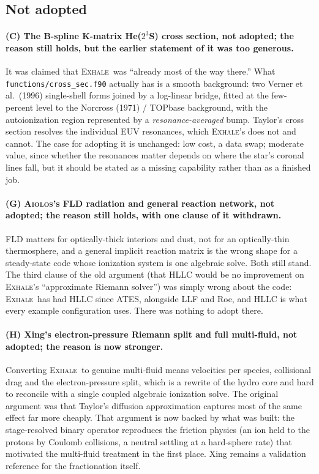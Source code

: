 \documentclass[english,a4paper]{my_memo}
\newcommand{\EXHALE}{\textsc{Exhale}}
\newcommand{\AIOLOS}{\textsc{Aiolos}}
\begin{document}
\subsection{Not adopted}

\paragraph{(C) The B-spline K-matrix He($2^3$S) cross section, not adopted;
the reason still holds, but the earlier statement of it was too generous.} It
was claimed that \EXHALE\ was ``already most of the way there.'' What
\texttt{functions/cross\_sec.f90} actually has is a smooth background: two
Verner et al.\ (1996) single-shell forms joined by a log-linear bridge, fitted
at the few-percent level to the Norcross (1971) / TOPbase background, with the
autoionization region represented by a \emph{resonance-averaged} bump. Taylor's
cross section resolves the individual EUV resonances, which \EXHALE's does not
and cannot. The case for adopting it is unchanged: low cost, a data swap;
moderate value, since whether the resonances matter depends on where the
star's coronal lines fall, but it should be stated as a missing capability
rather than as a finished job.

\paragraph{(G) \AIOLOS's FLD radiation and general reaction network, not
adopted; the reason still holds, with one clause of it withdrawn.} FLD matters
for optically-thick interiors and dust, not for an optically-thin thermosphere,
and a general implicit reaction matrix is the wrong shape for a steady-state
code whose ionization system is one algebraic solve. Both still stand. The
third clause of the old argument (that HLLC would be no improvement on
\EXHALE's ``approximate Riemann solver'') was simply wrong about the code:
\EXHALE\ has had HLLC since ATES, alongside LLF and Roe, and HLLC is what every
example configuration uses. There was nothing to adopt there.

\paragraph{(H) Xing's electron-pressure Riemann split and full multi-fluid,
not adopted; the reason is now stronger.} Converting \EXHALE\ to genuine
multi-fluid means velocities per species, collisional drag and the
electron-pressure split, which is a rewrite of the hydro core and hard to
reconcile with a single coupled algebraic ionization solve. The original
argument was that Taylor's diffusion approximation captures most of the same
effect far more cheaply. That argument is now backed by what was built: the
stage-resolved binary operator reproduces the friction physics (an ion held
to the protons by Coulomb collisions, a neutral settling at a hard-sphere rate)
that motivated the multi-fluid treatment in the first place. Xing remains a
validation reference for the fractionation itself.
\end{document}
